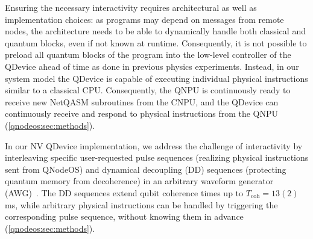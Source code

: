 Ensuring the necessary interactivity requires architectural as well as implementation choices: as programs may depend on messages from remote nodes, the architecture needs to be able to dynamically handle both classical and quantum blocks, even if not known at runtime.
Consequently, it is not possible to preload all quantum blocks of the program into the low-level controller of the QDevice ahead of time as done in previous physics experiments.
Instead, in our system model the QDevice is capable of executing individual physical instructions similar to a classical CPU.
Consequently, the QNPU is continuously ready to receive new NetQASM subroutines from the CNPU, and the QDevice can continuously receive and respond to physical instructions from the QNPU (\cref{qnodeos:sec:methods}).

In our NV QDevice implementation, we address the challenge of interactivity by interleaving specific user-requested pulse sequences (realizing physical instructions sent from QNodeOS) and dynamical decoupling (DD) sequences (protecting quantum memory from decoherence) in an arbitrary waveform generator (AWG)~\cite{zurich_instruments_hdawg_2019}.
The DD sequences extend qubit coherence times up to $T_{\text{coh}} = 13(2)$ ms, while arbitrary physical instructions can be handled by triggering the corresponding pulse sequence, without knowing them in advance (\cref{qnodeos:sec:methods}).

